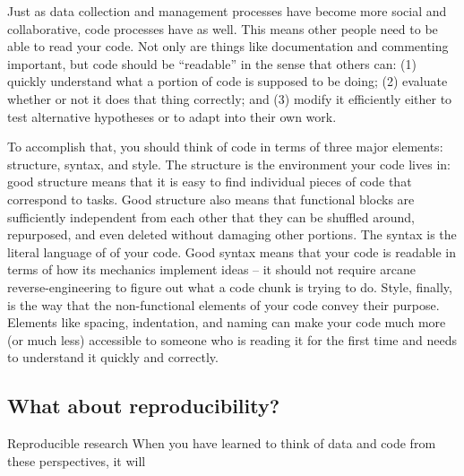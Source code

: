 Just as data collection and management processes have become more social and collaborative,
code processes have as well. This means other people need to be able to read your code.
Not only are things like documentation and commenting important,
but code should be ``readable'' in the sense that others can:
(1) quickly understand what a portion of code is supposed to be doing;
(2) evaluate whether or not it does that thing correctly; and
(3) modify it efficiently either to test alternative hypotheses or to adapt into their own work.

To accomplish that, you should think of code in terms of three major elements: structure, syntax, and style.
The structure is the environment your code lives in:
good structure means that it is easy to find individual pieces of code that correspond to tasks.
Good structure also means that functional blocks are sufficiently independent from each other
that they can be shuffled around, repurposed, and even deleted without damaging other portions.
The syntax is the literal language of of your code.
Good syntax means that your code is readable in terms of how its mechanics implement ideas --
it should not require arcane reverse-engineering to figure out what a code chunk is trying to do.
Style, finally, is the way that the non-functional elements of your code convey their purpose.
Elements like spacing, indentation, and naming can make your code much more (or much less)
accessible to someone who is reading it for the first time and needs to understand it quickly and correctly.

\subsection{What about reproducibility?}

Reproducible research 
When you have learned to think of data and code from these perspectives, it will

\mainmatter
